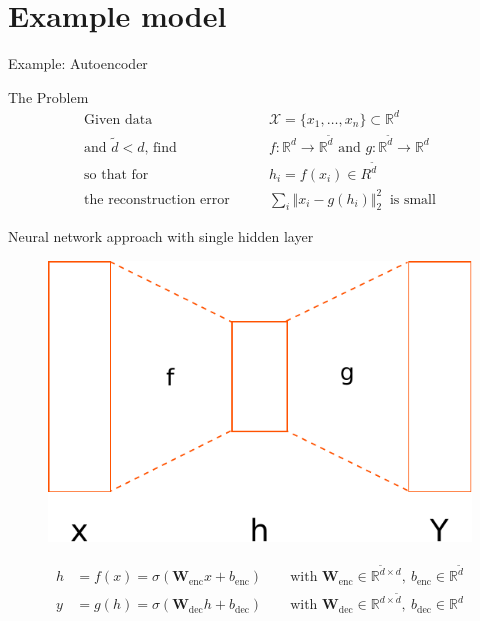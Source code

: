 \documentclass[mathserif]{beamer}
\begin{document}
\section{Example model}

\begin{frame}{Example: Autoencoder}
	\begin{block}{The Problem}
		\vspace{-0.3cm}
		\begin{align*}
			\text{Given data}&\qquad\mathcal X = \lbrace x_1,\dots,x_n\rbrace\subset\mathbb R^d\\
			\text{and $\tilde d < d$, find}&\qquad f:\mathbb R^d\rightarrow\mathbb R^{\tilde d} \text{\ and\ } g:\mathbb R^{\tilde d}\rightarrow\mathbb R^d\\
			\text{so that for}&\qquad h_i=f(x_i)\in{R}^{\tilde d}\\
			\text{the reconstruction error}&\qquad\sum_i\Vert x_i -g(h_i)\Vert_2^2\  \text{\ is small}
		\end{align*}
	\end{block}
	\vspace{-0.5cm}
	\begin{block}{Neural network approach with single hidden layer}
		\begin{figure}
			\centering\includegraphics[scale=0.4]{autoencoder.pdf}
		\end{figure}
		\vspace{-0.5cm}
		\begin{align*}
			h &= f(x)=\sigma\left(\mathbf W_\text{enc}x + b_\text{enc}\right)\qquad\text{with $\mathbf W_\text{enc}\in\mathbb R^{\tilde d\times d},\ b_\text{enc}\in\mathbb R^{\tilde d}$}\\
			y &= g(h)=\sigma\left(\mathbf W_\text{dec}h + b_\text{dec}\right)\qquad\text{with $\mathbf W_\text{dec}\in\mathbb R^{d\times\tilde d},\ b_\text{dec}\in\mathbb R^d$}
		\end{align*}
	\end{block}
\end{frame}
\end{document}

